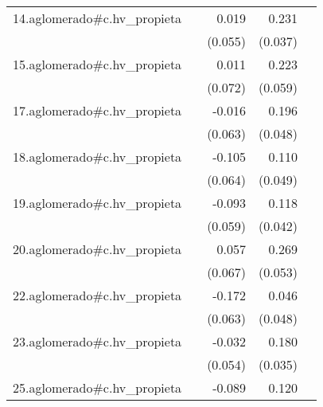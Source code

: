 {\begin{longtable}{l*{4}{D{.}{.}{-1}}}
\addlinespace
14.aglomerado#c.hv\_propieta&                     &       0.019         &       0.231\sym{***}&                     \\
            &                     &     (0.055)         &     (0.037)         &                     \\
\addlinespace
15.aglomerado#c.hv\_propieta&                     &       0.011         &       0.223\sym{***}&                     \\
            &                     &     (0.072)         &     (0.059)         &                     \\
\addlinespace
17.aglomerado#c.hv\_propieta&                     &      -0.016         &       0.196\sym{***}&                     \\
            &                     &     (0.063)         &     (0.048)         &                     \\
\addlinespace
18.aglomerado#c.hv\_propieta&                     &      -0.105         &       0.110\sym{*}  &                     \\
            &                     &     (0.064)         &     (0.049)         &                     \\
\addlinespace
19.aglomerado#c.hv\_propieta&                     &      -0.093         &       0.118\sym{**} &                     \\
            &                     &     (0.059)         &     (0.042)         &                     \\
\addlinespace
20.aglomerado#c.hv\_propieta&                     &       0.057         &       0.269\sym{***}&                     \\
            &                     &     (0.067)         &     (0.053)         &                     \\
\addlinespace
22.aglomerado#c.hv\_propieta&                     &      -0.172\sym{**} &       0.046         &                     \\
            &                     &     (0.063)         &     (0.048)         &                     \\
\addlinespace
23.aglomerado#c.hv\_propieta&                     &      -0.032         &       0.180\sym{***}&                     \\
            &                     &     (0.054)         &     (0.035)         &                     \\
\addlinespace
25.aglomerado#c.hv\_propieta&                     &      -0.089         &       0.120\sym{**} &                     \\

\end{longtable}}
